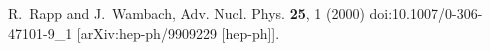 R.~Rapp and J.~Wambach,
Adv. Nucl. Phys. \textbf{25}, 1 (2000)
doi:10.1007/0-306-47101-9\_1
[arXiv:hep-ph/9909229 [hep-ph]].
